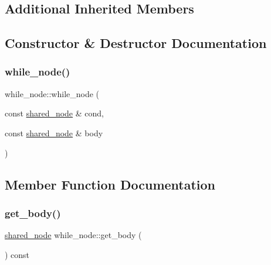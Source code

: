 \subsection*{Additional Inherited Members}


\subsection{Constructor \& Destructor Documentation}
\mbox{\label{classjawe_1_1while__node_ac3972090bfa9d2a8dbe288e2f32a3e8c}} 
\subsubsection{\texorpdfstring{while\+\_\+node()}{while\_node()}}
{\footnotesize\ttfamily while\+\_\+node\+::while\+\_\+node (\begin{DoxyParamCaption}\item[{const \hyperlink{namespacejawe_a3f307481d921b6cbb50cc8511fc2b544}{shared\+\_\+node} \&}]{cond,  }\item[{const \hyperlink{namespacejawe_a3f307481d921b6cbb50cc8511fc2b544}{shared\+\_\+node} \&}]{body }\end{DoxyParamCaption})}



\subsection{Member Function Documentation}
\mbox{\label{classjawe_1_1while__node_aa68f947d943b9495df133825c40430cd}} 
\subsubsection{\texorpdfstring{get\+\_\+body()}{get\_body()}}
{\footnotesize\ttfamily \hyperlink{namespacejawe_a3f307481d921b6cbb50cc8511fc2b544}{shared\+\_\+node} while\+\_\+node\+::get\+\_\+body (\begin{DoxyParamCaption}{ }\end{DoxyParamCaption}) const}

